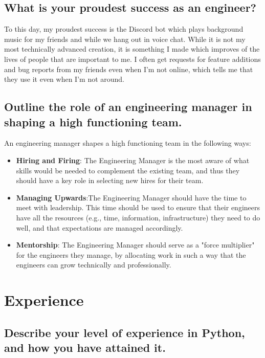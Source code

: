 \documentclass{article}
\begin{document}
\subsection{What is your proudest success as an engineer?}

To this day, my proudest success is the Discord bot which plays background music
for my friends and while we hang out in voice chat. While it is not my most
technically advanced creation, it is something I made which improves of the
lives of people that are important to me. I often get requests for feature
additions and bug reports from my friends even when I'm not online, which tells
me that they use it even when I'm not around.

\subsection{Outline the role of an engineering manager in shaping a high
  functioning team.}

An engineering manager shapes a high functioning team in the following ways:
\begin{itemize}
  \item \textbf{Hiring and Firing}: The Engineering Manager is the most aware of
        what skills would be needed to complement the existing team, and
        thus they should have a key role in selecting new hires for their
        team.

  \item \textbf{Managing Upwards}:The Engineering Manager should have the time
        to meet with leadership. This time should be used to
        ensure that their engineers have all the resources (e.g., time,
        information, infrastructure) they need to do well, and that
        expectations are managed accordingly.

  \item \textbf{Mentorship}: The Engineering Manager should serve as a "force
        multiplier" for the engineers they manage, by allocating work in such a way
        that the engineers can grow technically and professionally.

\end{itemize}

\section{Experience} \subsection{Describe your level of experience in Python,
  and how you have attained it.}
\end{document}
